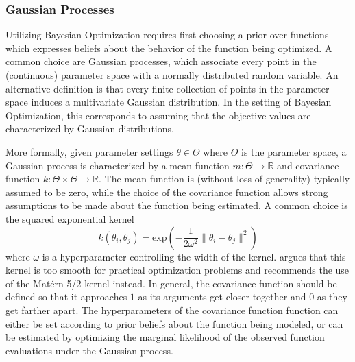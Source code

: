 \subsubsection{Gaussian Processes}

Utilizing Bayesian Optimization requires first choosing a prior over functions which expresses beliefs about the behavior of the function being optimized.
A common choice are Gaussian processes, which associate every point in the (continuous) parameter space with a normally distributed random variable.
An alternative definition is that every finite collection of points in the parameter space induces a multivariate Gaussian distribution.
In the setting of Bayesian Optimization, this corresponds to assuming that the objective values are characterized by Gaussian distributions.

More formally, given parameter settings $\theta \in \Theta$ where $\Theta$ is the parameter space, a Gaussian process is characterized by a mean function $m : \Theta \rightarrow \mathbb{R}$ and covariance function $k : \Theta \times \Theta \rightarrow \mathbb{R}$.
The mean function is (without loss of generality) typically assumed to be zero, while the choice of the covariance function allows strong assumptions to be made about the function being estimated.
A common choice is the squared exponential kernel
\begin{equation}
        k(\theta_i, \theta_j) = \mathrm{exp}\left(-\frac{1}{2\omega^2}\|\theta_i - \theta_j\|^2\right)
\end{equation}
where $\omega$ is a hyperparameter controlling the width of the kernel.
\cite{snoek2012practical} argues that this kernel is too smooth for practical optimization problems and recommends the use of the Mat\'ern 5/2 kernel instead.
In general, the covariance function should be defined so that it approaches $1$ as its arguments get closer together and $0$ as they get farther apart.
The hyperparameters of the covariance function function can either be set according to prior beliefs about the function being modeled, or can be estimated by optimizing the marginal likelihood of the observed function evaluations under the Gaussian process.

